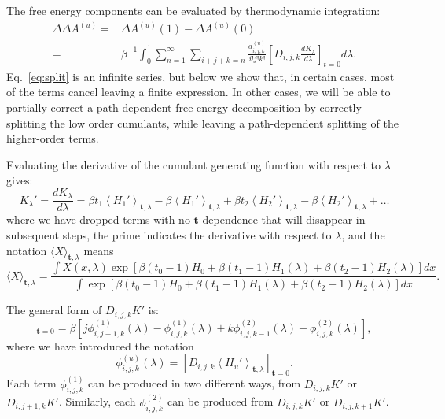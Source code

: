 \documentclass{article}
\let\vec\mathbf
\begin{document}
The free energy components can be evaluated by thermodynamic integration:
\begin{align}
\Delta\Delta A^{(u)} =& \Delta A^{(u)}(1) - \Delta A^{(u)}(0) \nonumber \\
					 =&
	\beta^{-1} \int_0^1 \sum_{n=1}^{\infty}
	\sum_{i+j+k=n}
	\frac{a_{i,j,k}^{(u)}}{i!j!k!}
    \left[ D_{i,j,k} \frac{dK_\lambda}{d\lambda}\right]_{t=0} d\lambda
    \label{eq:split}.
\end{align}
Eq.~\ref{eq:split} is an infinite series, but below we show that, in certain cases, most of the terms cancel leaving a finite expression. In other cases, we will be able to partially correct a path-dependent free energy decomposition by correctly splitting the low order cumulants, while leaving a path-dependent splitting of the higher-order terms.

Evaluating the derivative of the cumulant generating function with respect to $\lambda$ gives:
\begin{equation}
K_\lambda' = 
\frac{dK_\lambda}{d\lambda} =
	\beta t_1 \left\langle H_1' \right\rangle_{\vec t,\lambda} -
    \beta \left\langle H_1' \right\rangle_{\vec t,\lambda} +
    \beta t_2 \left\langle H_2' \right\rangle_{\vec t,\lambda} -
    \beta \left\langle H_2' \right\rangle_{\vec t,\lambda} + \ldots
\end{equation}
where we have dropped terms with no $\vec t$-dependence that will disappear in subsequent steps, the prime indicates the derivative with respect to $\lambda$, and the notation $\langle X \rangle_{\vec t, \lambda}$ means
\begin{equation}
\langle X \rangle_{\vec t, \lambda}  =
	\frac
    	{\int X(x, \lambda) 
        	\exp\left[
        		\beta(t_0-1)H_0 +
                \beta(t_1-1)H_1(\lambda) +
                \beta(t_2-1)H_2(\lambda)
            \right] dx
        }
    	{\int
        	\exp\left[
        		\beta(t_0-1)H_0 +
                \beta(t_1-1)H_1(\lambda) +
                \beta(t_2-1)H_2(\lambda)
            \right] dx
        }.
\end{equation}

The general form of $D_{i,j,k}K'$ is:
\begin{equation}
[D_{i,j,k}K_\lambda']_{\vec t=0} =
	\beta\left[
		j \phi_{i, j-1, k}^{(1)}(\lambda) -
    	\phi_{i,j,k}^{(1)}(\lambda) +
    	k \phi_{i, j, k-1}^{(2)}(\lambda) -
    	\phi_{i,j,k}^{(2)}(\lambda)
    \right],
\label{eq:deriv}
\end{equation}
where we have introduced the notation
\begin{equation}
\phi_{i,j,k}^{(u)}(\lambda) =
	\left[ D_{i,j,k} \left\langle
    	H_u'
    \right\rangle_{\vec t, \lambda} \right]_{\vec t=0}.
\end{equation}
Each term $\phi_{i,j,k}^{(1)}$ can be produced in two different ways, from $D_{i,j,k}K'$ or $D_{i,j+1,k}K'$. Similarly, each $\phi_{i,j,k}^{(2)}$ can be produced from $D_{i,j,k}K'$ or $D_{i,j,k+1}K'$.
\end{document}
